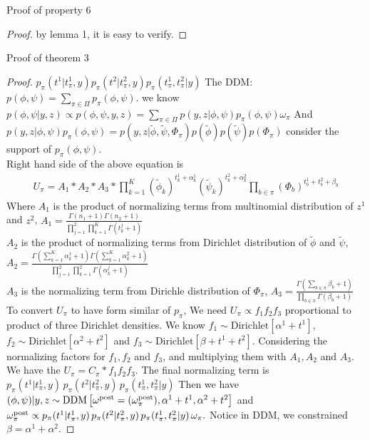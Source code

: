 \documentclass[aoas,preprint]{imsart}
\begin{document}
Proof of property 6
\begin{proof}
by lemma 1, it is easy to verify.
\end{proof}

Proof of theorem 3
\begin{proof}
$p_\pi ( t^1 | t_\pi^1, y) p_\pi ( t^2 | t_\pi^2 , y) p_\pi ( t_\pi^1, t_\pi^2 | y )$
The DDM: $p(\phi,\psi) = \sum_{\pi \in \Pi} p_\pi(\phi,\psi)$.
we know $p(\phi,\psi | y,z) \propto p(\phi,\psi, y, z) = \sum_{\pi \in \Pi}  p(y, z | \phi,\psi) p_\pi(\phi,\psi)\omega_\pi$
And $p(y, z | \phi,\psi) p_\pi(\phi,\psi) = p(y, z | \tilde{\phi} , \tilde{\psi}, \Phi_\pi) p(\tilde{\phi}) p (\tilde{\psi}) p(\Phi_\pi)$ consider the support of $p_\pi(\phi, \psi)$.\\
Right hand side of the above equation is 
\begin{eqnarray*}
U_\pi = A_1 * A_2 * A_3 *\prod_{k = 1}^K (\tilde{ \phi }_k)^{t_k^1 + \alpha_k^1} (\tilde{ \psi }_k)^{t_k^2 + \alpha_k^2}   \prod_{b \in \pi} (\Phi_b)^{t_b^1 + t_b^2 + \beta_b}
\end{eqnarray*}
Where $A_1$ is the product of normalizing terms from multinomial distribution of $z^1$ and $z^2$, $A_1 =  \frac{\Gamma(n_1 + 1)\Gamma(n_2 + 1)}{\prod_{j = 1}^2\prod_{k = 1}^K \Gamma(t_k^j + 1) } $\\
$A_2$ is the product of normalizing terms from Dirichlet distribution of $\tilde{\phi}$ and $\tilde{\psi}$,
$A_2 = \frac{ \Gamma( \sum_{k = 1}^K \alpha_k^1 + 1)  \Gamma( \sum_{k = 1}^K \alpha_k^2 + 1)}{ \prod_{j = 1}^2 \prod_{k = 1}^2 \Gamma(\alpha_k^j + 1)}$\\
$A_3$ is the normalizing term from Dirichle distribution of $\Phi_\pi$, $A_3 = \frac{\Gamma(\sum_{b \in \pi } \beta_b + 1)}{\prod_{b\in \pi} \Gamma(\beta_b + 1)}$\\
To convert $U_\pi$ to have form similar of $p_\pi$, We need $U_\pi \propto f_1 f_2 f_3$ proportional to product of three Dirichlet densities. We know $f_1 \sim \text{Dirichlet}[\alpha^1 + t^1]$, $f_2 \sim \text{Dirichlet}[\alpha^2 + t^2]$ and $f_3 \sim \text{Dirichlet}[\beta + t^1 + t^2]$. Considering the normalizing factors for $f_1,f_2$ and $f_3$, and multiplying them with $A_1, A_2$ and $A_3$. We have the $U_\pi = C_\pi * f_1 f_2 f_3$. The final normalizing term is $ p_\pi(t^1 | t^1_{\pi},y)\, p_\pi(t^2|  t^2_{\pi},y )
 \, p_\pi( t^1_{\pi}, t^2_{\pi} | y )$ Then we have $(\phi,\psi)|y,z  \sim {\mbox {\rm DDM}}\left[ \omega^{\rm post}=(\omega^{\rm post}_\pi), \alpha^1 + t^1, \alpha^2 + t^2  \right]$ and $\omega^{\rm post}_\pi \propto 
 p_\pi(t^1 | t^1_{\pi},y)\, p_\pi(t^2|  t^2_{\pi},y )
 \, p_\pi( t^1_{\pi}, t^2_{\pi} | y ) \, \omega_\pi.$ Notice in DDM, we constrained $\beta = \alpha^1 + \alpha^2$.

\end{proof}
\end{document}
